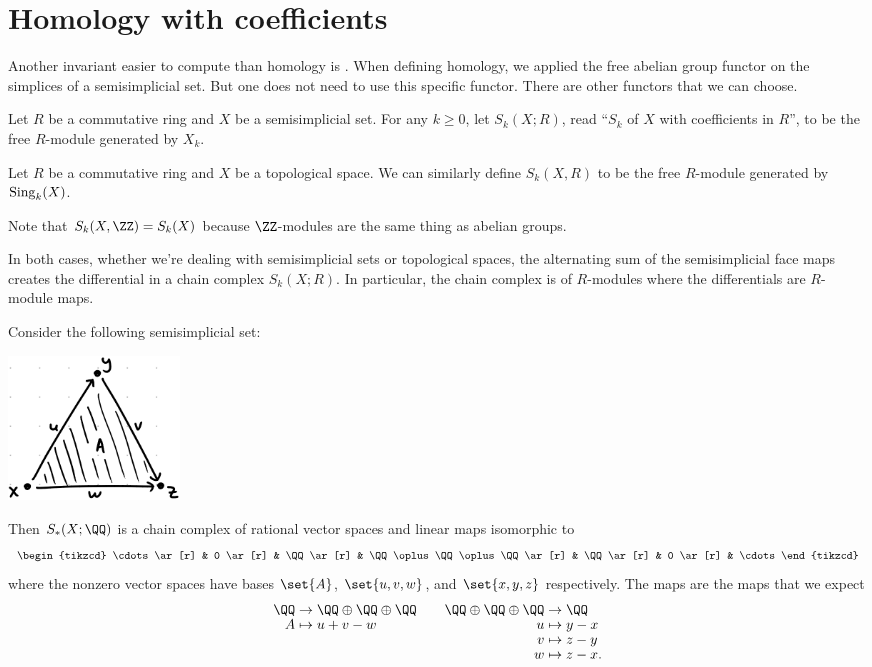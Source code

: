 \documentclass{standalone}
\begin{document}
\section{Homology with coefficients}
Another invariant easier to compute than homology is
.
When defining homology, we applied the free abelian group functor
on the simplices of a semisimplicial set.
But one does not need to use this specific functor.
There are other functors that we can choose.
\begin{definition}
  Let \(R\) be a commutative ring and \(X\) be a semisimplicial set.
  For any \(k \geq 0\), let \(S_k(X; R)\),
  read ``\(S_k\) of \(X\) with coefficients in \(R\)'',
  to be the free \(R\)-module generated by \(X_k\).

  Let \(R\) be a commutative ring and \(X\) be a topological space.
  We can similarly define \(S_k(X, R)\) to be the free \(R\)-module
  generated by \(\operatorname{Sing}_k(X)\).
\end{definition}
Note that \(S_k(X, \ZZ) = S_k(X)\) because \(\ZZ\)-modules are
the same thing as abelian groups.

In both cases, whether we're dealing with semisimplicial sets
or topological spaces, the alternating sum of the semisimplicial face maps
creates the differential in a chain complex \(S_k(X; R)\).
In particular, the chain complex is of \(R\)-modules where
the differentials are \(R\)-module maps.

\begin{example}
  Consider the following semisimplicial set:
  \begin{center}
    \includegraphics[width=0.2\textwidth]{18_905-201013-1.png}
  \end{center}
  Then \(S_*(X; \QQ)\) is a chain complex of rational vector spaces
  and linear maps isomorphic to
  \[
    \begin{tikzcd}
    	\cdots \ar[r] &
    	0 \ar[r] &
    	\QQ \ar[r] &
    	\QQ \oplus \QQ \oplus \QQ \ar[r] &
    	\QQ \ar[r] &
    	0 \ar[r] &
    	\cdots
    \end{tikzcd}
  \]
  where the nonzero vector spaces have bases \(\set{A}\), \(\set{u, v, w}\),
  and \(\set{x, y, z}\) respectively.
  The maps are the maps that we expect
  \[
    \begin{aligned}[t]
      \QQ & \to \QQ \oplus \QQ \oplus \QQ \\[-1ex]
      A &\mapsto u + v - w
    \end{aligned}
    \qquad
    \begin{aligned}[t]
      \QQ \oplus \QQ \oplus \QQ & \to \QQ \\[-1ex]
      u &\mapsto y - x \\[-1ex]
      v &\mapsto z - y \\[-1ex]
      w &\mapsto z - x.
    \end{aligned}
  \]
\end{example}
\end{document}
